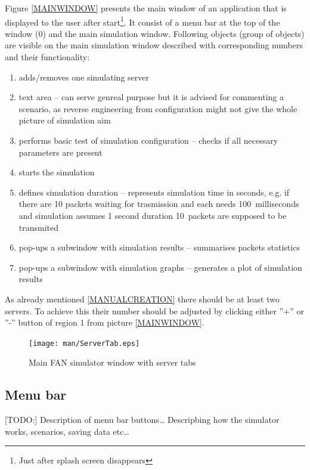 \documentclass[a4paper,12pt]{article}
\begin{document}
	Figure \ref{MAINWINDOW} presents the main window of an application that is
	displayed to the user after start\footnote{Just after splash screen disappears}. It
	consist of a menu bar at the top of the window (0) and the main 
	simulation window. Following objects (group of objects) are visible on the main
	simulation window described with corresponding numbers and their functionality:
	\begin{enumerate}
	\item {adds/removes one simulating server}
	\item {text area -- can serve genreal purpose but it is advised for commenting
	a scenario, as reverse engineering from configuration might not give the whole
	picture of simulation aim}
	\item {performs basic test of simulation configuration -- checks if all
	necessary parameters are present}
	\item {starts the simulation}
	\item {defines simulation duration -- represents simulation time in seconds,
	e.g. if there are 10 packets waiting for trasmission and each needs
	100~milliseconds and simulation assumes 1 second duration 10~packets are
	supposed to be transmited }
	\item {pop-ups a subwindow with simulation results -- summarises packets
	statistics}
	\item {pop-ups a subwindow with simulation graphs -- generates a plot
	of simulation results}
    \end{enumerate}
    
    As already mentioned \ref{MANUALCREATION} there should be at least two
    servers. To achieve this their number should be adjusted by clicking either
    ''+'' or ''-'' button of region 1 from picture \ref{MAINWINDOW}.
 	\begin{figure}[h]
	\texttt{[image: man/ServerTab.eps]}
	\caption{Main FAN simulator window with server tabs}
	\label{SERVERTAB}
	\end{figure}



	\subsection{Menu bar}
	
	[TODO:]
	Description of menu bar buttons\ldots
	Descripbing how the simulator works, scenarios,	saving data etc\ldots




	\newpage
\end{document}
